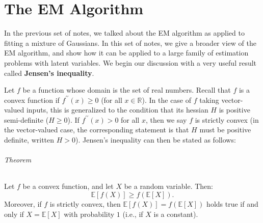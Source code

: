 \titlespacing*{\part}{0pt}{-20pt}{30pt} %
\titlespacing*{\chapter}{0pt}{-10pt}{30pt}

\part{The EM Algorithm}
\label{part:em_alg}


In the previous set of notes, we talked about the EM algorithm as applied to
fitting a mixture of Gaussians. In this set of notes, we give a broader view
of the EM algorithm, and show how it can be applied to a large family of
estimation problems with latent variables. We begin our discussion with a
very useful result called \textbf{Jensen's inequality}. %

\vspace{1cm}
\label{cha:jensens}
Let $f$ be a function whose domain is the set of real numbers. Recall that
$f$ is a convex function if $f^{\prime\prime}(x) \ge 0$ (for all $x \in \mathbb R$). In the case of $f$ taking
vector-valued inputs, this is generalized to the condition that its hessian $H$
is positive semi-definite ($H \ge 0$). If $f^{\prime\prime}(x) > 0$ for all $x$, then we say $f$ is
strictly convex (in the vector-valued case, the corresponding statement is
that $H$ must be positive definite, written $H > 0$). Jensen's inequality can
then be stated as follows:
\paragraph{Theorem} Let $f$ be a convex function, and let $X$ be a random variable. Then:
\begin{equation}
    \mathbb E[f(X)] \ge f(\mathbb E[X]).
\end{equation}
Moreover, if $f$ is strictly convex, then $\mathbb E[f(X)] = f(\mathbb E[X])$ holds true if and
only if $X = \mathbb E[X]$ with probability $1$ (i.e., if $X$ is a constant).


